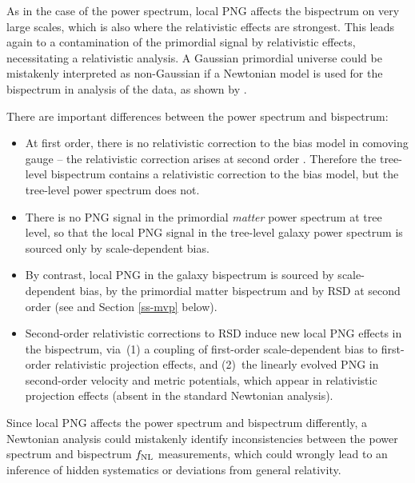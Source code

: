 {As in the case of the power spectrum, local PNG affects the bispectrum on very large scales, which is also where the relativistic effects are strongest. This leads again to a contamination of the primordial signal by relativistic effects, necessitating a relativistic analysis. A Gaussian primordial universe could be mistakenly interpreted as non-Gaussian if a Newtonian model is used for the bispectrum in analysis of the data, as shown by 
\cite{Kehagias:2015tda,Umeh:2016nuh,Jolicoeur:2017nyt,Koyama:2018ttg}. 

{There are important differences between the power spectrum and bispectrum:
\begin{itemize}
\item
At first order, there is no relativistic correction to the bias model in comoving gauge -- the relativistic correction arises at second order \cite{Umeh:2019qyd, Umeh:2019jqg}. Therefore the tree-level bispectrum contains a relativistic correction to the bias model, but the tree-level power spectrum does not.
\item
There is no PNG signal in the primordial {\em matter} power spectrum at tree level, so that the local PNG signal in the tree-level galaxy power spectrum is sourced only by scale-dependent bias. 
\item
By contrast, local PNG in the galaxy bispectrum is sourced by scale-dependent bias, by the primordial matter bispectrum {and by RSD at second order (see \cite{Tellarini:2016sgp} and Section \ref{ss-mvp} below)}.
\item
 Second-order relativistic {corrections to RSD}  induce new local PNG effects in the bispectrum, via~(1) a coupling of first-order scale-dependent bias to first-order relativistic projection effects,  and {(2)~the linearly evolved PNG in second-order velocity and metric potentials, which appear in relativistic projection effects (absent in the standard Newtonian analysis)}. 
\end{itemize}}

Since local PNG affects the power spectrum and bispectrum differently, a Newtonian analysis could mistakenly identify inconsistencies between the power spectrum and bispectrum $f_\text{NL}$ measurements, which could wrongly lead to an inference of hidden systematics or deviations from general relativity.}

